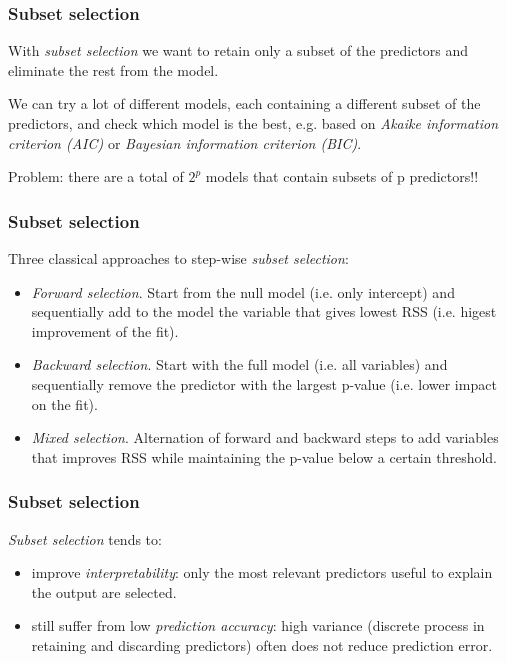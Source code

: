 \documentclass[notes]{beamer}          %
\begin{document}
\begin{frame}
\frametitle{Subset selection}

With \textit{subset selection} we want to retain only a subset of the predictors and eliminate the rest from the model.

\vspace{5mm} 

We can try a lot of different models, each containing a different subset of the predictors, and check which model is the best, e.g. based on \textit{Akaike information criterion (AIC)} or \textit{Bayesian information criterion (BIC)}.

\vspace{5mm} 

Problem: there are a total of $2^p$ models that contain subsets of p predictors!!

\end{frame}

\begin{frame}
\frametitle{Subset selection}

Three classical approaches to step-wise \textit{subset selection}:

\begin{itemize}
    \item \textit{Forward selection}. Start from the null model (i.e. only intercept) and sequentially add to the model the variable that gives lowest RSS (i.e. higest improvement of the fit).
    \item \textit{Backward selection}. Start with the full model (i.e. all variables) and sequentially remove the predictor with the largest p-value (i.e. lower impact on the fit).
    \item \textit{Mixed selection}. Alternation of forward and backward steps to add variables that improves RSS while maintaining the p-value below a certain threshold.
\end{itemize}

\end{frame}

\begin{frame}
\frametitle{Subset selection}

\textit{Subset selection} tends to:

\begin{itemize}
    \item improve \textit{interpretability}: only the most relevant predictors useful to explain the output are selected.
    \item still suffer from  low \textit{prediction accuracy}: high variance (discrete process in retaining and discarding predictors) often does not reduce prediction error.
\end{itemize}

\end{frame}
\end{document}
